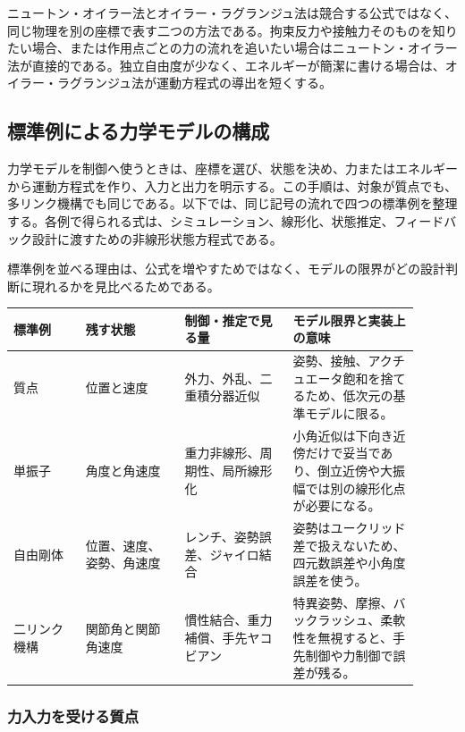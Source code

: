 ニュートン・オイラー法とオイラー・ラグランジュ法は競合する公式ではなく、同じ物理を別の座標で表す二つの方法である。拘束反力や接触力そのものを知りたい場合、または作用点ごとの力の流れを追いたい場合はニュートン・オイラー法が直接的である。独立自由度が少なく、エネルギーが簡潔に書ける場合は、オイラー・ラグランジュ法が運動方程式の導出を短くする。

\subsection{標準例による力学モデルの構成}

力学モデルを制御へ使うときは、座標を選び、状態を決め、力またはエネルギーから運動方程式を作り、入力と出力を明示する。この手順は、対象が質点でも、多リンク機構でも同じである。以下では、同じ記号の流れで四つの標準例を整理する。各例で得られる式は、シミュレーション、線形化、状態推定、フィードバック設計に渡すための非線形状態方程式である。

標準例を並べる理由は、公式を増やすためではなく、モデルの限界がどの設計判断に現れるかを見比べるためである。

\begin{center}
\scriptsize
\setlength{\tabcolsep}{3pt}
\renewcommand{\arraystretch}{1.25}
\begin{tabular}{|>{\raggedright\arraybackslash}p{0.16\linewidth}|>{\raggedright\arraybackslash}p{0.22\linewidth}|>{\raggedright\arraybackslash}p{0.24\linewidth}|>{\raggedright\arraybackslash}p{0.28\linewidth}|}
\hline
標準例 & 残す状態 & 制御・推定で見る量 & モデル限界と実装上の意味\\
\hline
質点 & 位置と速度 & 外力、外乱、二重積分器近似 & 姿勢、接触、アクチュエータ飽和を捨てるため、低次元の基準モデルに限る。\\
\hline
単振子 & 角度と角速度 & 重力非線形、周期性、局所線形化 & 小角近似は下向き近傍だけで妥当であり、倒立近傍や大振幅では別の線形化点が必要になる。\\
\hline
自由剛体 & 位置、速度、姿勢、角速度 & レンチ、姿勢誤差、ジャイロ結合 & 姿勢はユークリッド差で扱えないため、四元数誤差や小角度誤差を使う。\\
\hline
二リンク機構 & 関節角と関節角速度 & 慣性結合、重力補償、手先ヤコビアン & 特異姿勢、摩擦、バックラッシュ、柔軟性を無視すると、手先制御や力制御で誤差が残る。\\
\hline
\end{tabular}
\end{center}

\subsubsection{力入力を受ける質点}

